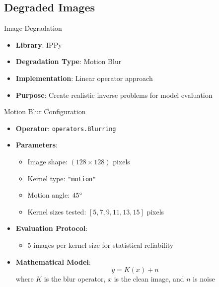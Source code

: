\subsection{Degraded Images}

\begin{frame}{Image Degradation}
    \begin{itemize}
        \item \textbf{Library}: IPPy
        \item \textbf{Degradation Type}: Motion Blur
        \item \textbf{Implementation}: Linear operator approach
        \item \textbf{Purpose}: Create realistic inverse problems for model evaluation
    \end{itemize}
\end{frame}

\begin{frame}{Motion Blur Configuration}
    \begin{itemize}
        \item \textbf{Operator}: \texttt{operators.Blurring}
        \item \textbf{Parameters}:
              \begin{itemize}
                  \item Image shape: $(128 \times 128)$ pixels
                  \item Kernel type: \texttt{"motion"}
                  \item Motion angle: $45\degree$
                  \item Kernel sizes tested: $[5, 7, 9, 11, 13, 15]$ pixels
              \end{itemize}
        \item \textbf{Evaluation Protocol}:
              \begin{itemize}
                  \item 5 images per kernel size for statistical reliability
              \end{itemize}
        \item \textbf{Mathematical Model}:
              \begin{equation}
                  y = K(x) + n
              \end{equation}
              where $K$ is the blur operator, $x$ is the clean image, and $n$ is noise
    \end{itemize}
\end{frame}